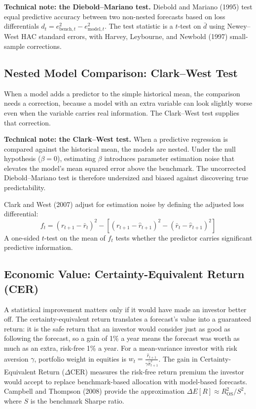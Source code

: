 \begin{technote}
\textbf{Technical note: the Diebold--Mariano test.} Diebold and Mariano (1995) test equal predictive accuracy between two non-nested forecasts based on loss differentials $d_t = e^2_{\text{bench},t} - e^2_{\text{model},t}$. The test statistic is a $t$-test on $\bar{d}$ using Newey--West HAC standard errors, with Harvey, Leybourne, and Newbold (1997) small-sample corrections.
\end{technote}

\subsection{Nested Model Comparison: Clark--West Test}
When a model adds a predictor to the simple historical mean, the comparison needs a correction, because a model with an extra variable can look slightly worse even when the variable carries real information. The Clark--West test supplies that correction.

\begin{technote}
\textbf{Technical note: the Clark--West test.} When a predictive regression is compared against the historical mean, the models are nested. Under the null hypothesis ($\beta=0$), estimating $\beta$ introduces parameter estimation noise that elevates the model's mean squared error above the benchmark. The uncorrected Diebold--Mariano test is therefore undersized and biased against discovering true predictability.

Clark and West (2007) adjust for estimation noise by defining the adjusted loss differential:
\begin{equation}
  f_t = (r_{t+1} - \bar r_t)^2 - \left[(r_{t+1} - \hat r_{t+1})^2 - (\bar r_t - \hat r_{t+1})^2\right]
  \label{eq:09-cw}
\end{equation}
A one-sided $t$-test on the mean of $f_t$ tests whether the predictor carries significant predictive information.
\end{technote}

\subsection{Economic Value: Certainty-Equivalent Return (CER)}
A statistical improvement matters only if it would have made an investor better off. The certainty-equivalent return translates a forecast's value into a guaranteed return: it is the safe return that an investor would consider just as good as following the forecast, so a gain of 1\% a year means the forecast was worth as much as an extra, risk-free 1\% a year. For a mean-variance investor with risk aversion $\gamma$, portfolio weight in equities is $w_t = \frac{\hat{r}_{t+1}}{\gamma \hat{\sigma}^2_{t+1}}$. The gain in Certainty-Equivalent Return ($\Delta \text{CER}$) measures the risk-free return premium the investor would accept to replace benchmark-based allocation with model-based forecasts. Campbell and Thompson (2008) provide the approximation $\Delta E[R] \approx R^2_{\text{OS}} / S^2$, where $S$ is the benchmark Sharpe ratio.

